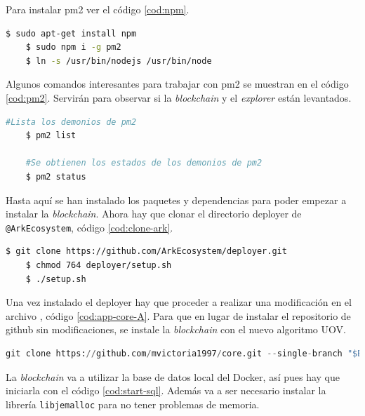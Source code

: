 Para instalar pm2 ver el código \ref{cod:npm}.\\

\begin{lstlisting}[language=Bash,caption=Instalación \textit{blockchain}. Parte VIII, label=cod:npm, style=Consola]
	$ sudo apt-get install npm
	$ sudo npm i -g pm2
	$ ln -s /usr/bin/nodejs /usr/bin/node
\end{lstlisting}

Algunos comandos interesantes para trabajar con pm2 se muestran en el código \ref{cod:pm2}. Servirán para observar si la \textit{blockchain} y el \textit{explorer} están levantados.

\begin{lstlisting}[language=Bash,caption=Comandos útiles de pm2, label=cod:pm2, style=Consola]
	#Lista los demonios de pm2
	$ pm2 list

	#Se obtienen los estados de los demonios de pm2
	$ pm2 status
\end{lstlisting}

Hasta aquí se han instalado los paquetes y dependencias para poder empezar a instalar la \textit{blockchain}. Ahora hay que clonar el directorio deployer de \texttt{@ArkEcosystem}, código \ref{cod:clone-ark}.\\

\begin{lstlisting}[language=Bash,caption=Instalación \textit{blockchain}. Parte IX, label=cod:clone-ark, style=Consola]
	$ git clone https://github.com/ArkEcosystem/deployer.git
	$ chmod 764 deployer/setup.sh
	$ ./setup.sh
\end{lstlisting}


Una vez instalado el deployer hay que proceder a realizar una modificación en el archivo , código \ref{cod:app-core-A}. Para que en lugar de instalar el repositorio de github sin modificaciones, se instale la \textit{blockchain} con el nuevo algoritmo UOV.

\begin{lstlisting}[language=Python,caption=Línea 108 app-core.sh, label=cod:app-core-A]
	git clone https://github.com/mvictoria1997/core.git --single-branch "$BRIDGECHAIN_PATH"
\end{lstlisting}

La \textit{blockchain} va a utilizar la base de datos local del Docker, así pues hay que iniciarla con el código \ref{cod:start-sql}. Además va a ser necesario instalar la librería \texttt{libjemalloc} para no tener problemas de memoria.

